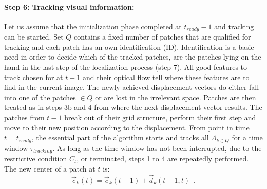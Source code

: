 \paragraph{Step 6: Tracking visual information:}
%
Let us assume that the initialization phase completed at $t_{ready} -1$ and tracking can be started. Set $Q$ contains a fixed number of patches that are qualified for tracking and each patch has an own identification (ID). Identification is a basic need in order to decide which of the tracked patches, are the patches lying on the hand in the last step of the localization process (step 7). All good features to track chosen for at $t-1$ and their optical flow tell where these features are to find in the current image. The newly achieved displacement vectors do either fall into one of the patches $\in Q$ or are lost in the irrelevant space. Patches are then treated as in steps 3b and 4 from where the next displacement vector results. The patches from $t-1$ break out of their grid structure, perform their first step and move to their new position according to the displacement. From point in time $t=t_{ready}$, the essential part of the algorithm starts and tracks all $\Lambda_{k \in Q} $ for a time window $\tau_{tracking}$. As long as the time window has not been interrupted, due to the restrictive condition $C_t$, or terminated, steps 1 to 4 are repeatedly performed. The new center of a patch at $t$ is:
%
\begin{equation}\label{newpos1}
	\vec{c}_k\left( t \right) = \vec{c}_k \left( t -1 \right) + \vec{d}_k\left( t -1, t\right) \enspace .
\end{equation}

